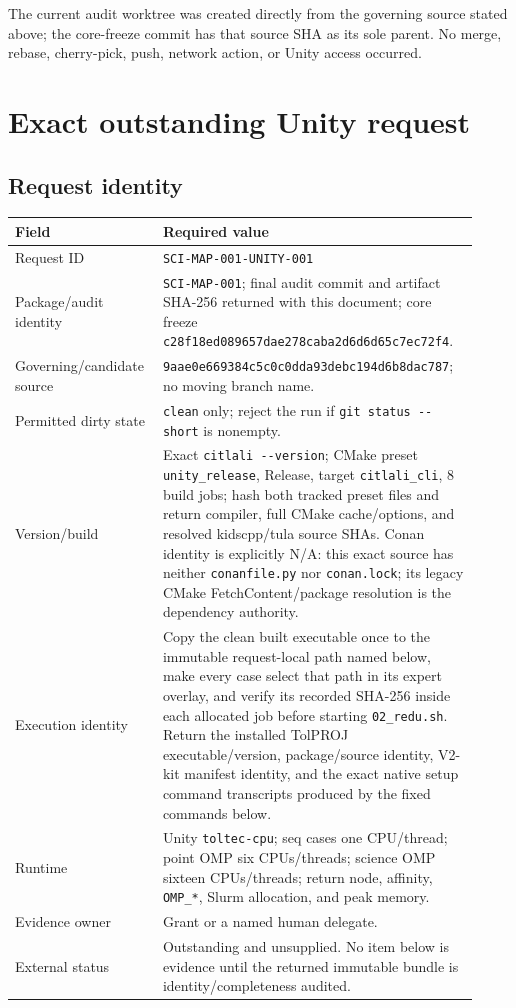 \documentclass[11pt]{article}
\newcommand{\code}[1]{\nolinkurl{#1}}
\newcommand{\gitsha}[5]{\texttt{#1\allowbreak#2\allowbreak#3\allowbreak#4\allowbreak#5}}
\newcommand{\AuditGoverningSHA}{\gitsha{9aae0e66}{9384c5c0}{c0dda93d}{ebc194d6}{b8dac787}}
\newcommand{\AuditCoreFreezeCommit}{\gitsha{c28f18ed}{089657da}{e278caba}{2d6d6d65}{c7ec72f4}}
\begin{document}
The current audit worktree was created directly from the governing source
stated above; the core-freeze commit has that source SHA as its sole parent.
No merge, rebase, cherry-pick, push, network action, or Unity access occurred.

\section{Exact outstanding Unity request}
\label{app:unity-request}

\subsection*{Request identity}

\begin{longtable}{L{0.28\linewidth}L{0.64\linewidth}}
\toprule
Field & Required value\\
\midrule
Request ID & \code{SCI-MAP-001-UNITY-001}\\
Package/audit identity & \code{SCI-MAP-001}; final audit commit and artifact
SHA-256 returned with this document; core freeze
\AuditCoreFreezeCommit.\\
Governing/candidate source & \AuditGoverningSHA; no moving branch name.\\
Permitted dirty state & \code{clean} only; reject the run if
\code{git status --short} is nonempty.\\
Version/build & Exact \code{citlali --version}; CMake preset
\code{unity_release}, Release, target \code{citlali_cli}, 8 build jobs; hash
both tracked preset files and return compiler, full CMake cache/options, and
resolved kidscpp/tula source SHAs.  Conan identity is explicitly N/A: this exact
source has neither \code{conanfile.py} nor \code{conan.lock}; its legacy CMake
FetchContent/package resolution is the dependency authority.\\
Execution identity & Copy the clean built executable once to the immutable
request-local path named below, make every case select that path in its expert
overlay, and verify its recorded SHA-256 inside each allocated job before
starting \code{02_redu.sh}.  Return the installed TolPROJ executable/version,
package/source identity, V2-kit manifest identity, and the exact native setup
command transcripts produced by the fixed commands below.\\
Runtime & Unity \code{toltec-cpu}; seq cases one CPU/thread; point OMP six
CPUs/threads; science OMP sixteen CPUs/threads; return node, affinity,
\code{OMP_*}, Slurm allocation, and peak memory.\\
Evidence owner & Grant or a named human delegate.\\
External status & Outstanding and unsupplied.  No item below is evidence until
the returned immutable bundle is identity/completeness audited.\\
\bottomrule
\end{longtable}
\end{document}

